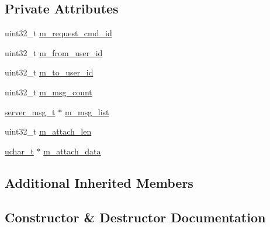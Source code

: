 \subsection*{Private Attributes}
\begin{DoxyCompactItemize}
\item 
uint32\+\_\+t \hyperlink{class_c_im_pdu_msg_list_response_aed1c0ea5e695b0f26013caec3460a2b4}{m\+\_\+request\+\_\+cmd\+\_\+id}
\item 
uint32\+\_\+t \hyperlink{class_c_im_pdu_msg_list_response_a518c33aaf232cd375382ab5f81094a6a}{m\+\_\+from\+\_\+user\+\_\+id}
\item 
uint32\+\_\+t \hyperlink{class_c_im_pdu_msg_list_response_ab247961d10c2d1a91cfe1c1b174e6709}{m\+\_\+to\+\_\+user\+\_\+id}
\item 
uint32\+\_\+t \hyperlink{class_c_im_pdu_msg_list_response_a3f20e74f22826988fe8f4ed7b1b4451f}{m\+\_\+msg\+\_\+count}
\item 
\hyperlink{structserver__msg__t}{server\+\_\+msg\+\_\+t} $\ast$ \hyperlink{class_c_im_pdu_msg_list_response_a3f31c315d2d97fe4870eb6b32179fdf2}{m\+\_\+msg\+\_\+list}
\item 
uint32\+\_\+t \hyperlink{class_c_im_pdu_msg_list_response_a7b2a2ff1a82f683f3321921a3e011908}{m\+\_\+attach\+\_\+len}
\item 
\hyperlink{base_2ostype_8h_a124ea0f8f4a23a0a286b5582137f0b8d}{uchar\+\_\+t} $\ast$ \hyperlink{class_c_im_pdu_msg_list_response_a21d6d65cd8526c748e7213ec0d942f2d}{m\+\_\+attach\+\_\+data}
\end{DoxyCompactItemize}
\subsection*{Additional Inherited Members}


\subsection{Constructor \& Destructor Documentation}
\hypertarget{class_c_im_pdu_msg_list_response_a554fb5dad333717c3aa8b29e397ba01b}{}

